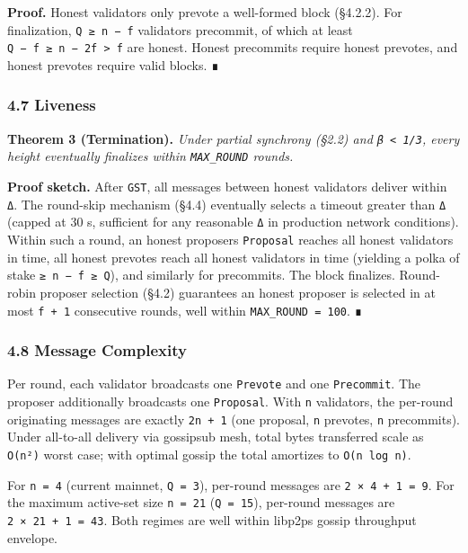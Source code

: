 \documentclass[11pt,a4paper]{article}
\begin{document}
\textbf{Proof.} Honest validators only prevote a well-formed block
(§4.2.2). For finalization, \texttt{Q\ ≥\ n\ −\ f} validators precommit,
of which at least \texttt{Q\ −\ f\ ≥\ n\ −\ 2f\ \textgreater{}\ f} are
honest. Honest precommits require honest prevotes, and honest prevotes
require valid blocks. ∎

\hypertarget{47-liveness}{%
\subsubsection{4.7 Liveness}\label{47-liveness}}

\textbf{Theorem 3 (Termination).} \emph{Under partial synchrony (§2.2)
and \texttt{β\ \textless{}\ 1/3}, every height eventually finalizes
within \texttt{MAX\_ROUND} rounds.}

\textbf{Proof sketch.} After \texttt{GST}, all messages between honest
validators deliver within \texttt{Δ}. The round-skip mechanism (§4.4)
eventually selects a timeout greater than \texttt{Δ} (capped at 30 s,
sufficient for any reasonable \texttt{Δ} in production network
conditions). Within such a round, an honest proposer\textquotesingle s
\texttt{Proposal} reaches all honest validators in time, all honest
prevotes reach all honest validators in time (yielding a polka of stake
\texttt{≥\ n\ −\ f\ ≥\ Q}), and similarly for precommits. The block
finalizes. Round-robin proposer selection (§4.2) guarantees an honest
proposer is selected in at most \texttt{f\ +\ 1} consecutive rounds,
well within \texttt{MAX\_ROUND\ =\ 100}. ∎

\hypertarget{48-message-complexity}{%
\subsubsection{4.8 Message Complexity}\label{48-message-complexity}}

Per round, each validator broadcasts one \texttt{Prevote} and one
\texttt{Precommit}. The proposer additionally broadcasts one
\texttt{Proposal}. With \texttt{n} validators, the per-round originating
messages are exactly \texttt{2n\ +\ 1} (one proposal, \texttt{n}
prevotes, \texttt{n} precommits). Under all-to-all delivery via
gossipsub mesh, total bytes transferred scale as \texttt{O(n²)} worst
case; with optimal gossip the total amortizes to \texttt{O(n\ log\ n)}.

For \texttt{n\ =\ 4} (current mainnet, \texttt{Q\ =\ 3}), per-round
messages are \texttt{2\ ×\ 4\ +\ 1\ =\ 9}. For the maximum active-set
size \texttt{n\ =\ 21} (\texttt{Q\ =\ 15}), per-round messages are
\texttt{2\ ×\ 21\ +\ 1\ =\ 43}. Both regimes are well within
libp2p\textquotesingle s gossip throughput envelope.
\end{document}
